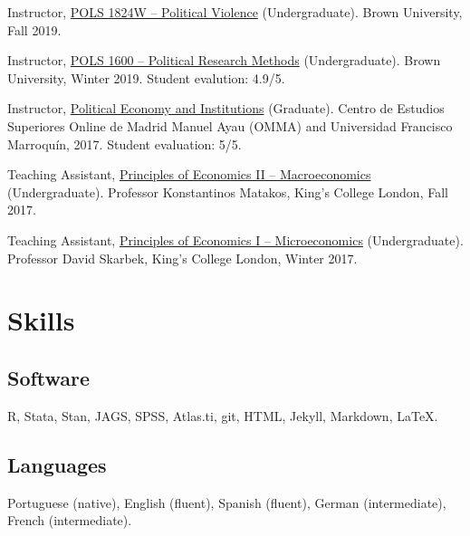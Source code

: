 \documentclass[a4paper]{article}
\renewenvironment{itemize}{
	\begin{list}{}{
			\setlength{\leftmargin}{1.5em}
		}
		}{
	\end{list}
}
\begin{document}
	\begin{itemize}
	\item Instructor, \href{http://danilofreire.github.io/pols1842w}{POLS 1824W -- Political Violence} (Undergraduate). Brown University, Fall 2019. 
	\item Instructor, \href{http://danilofreire.github.io}{POLS 1600 -- Political Research Methods} (Undergraduate). Brown University, Winter 2019. Student evalution: 4.9/5.
	\item Instructor, \href{https://github.com/danilofreire/economia-politica-instituicoes-ufm}{Political Economy and Institutions} (Graduate). Centro de Estudios Superiores Online de Madrid Manuel Ayau (OMMA) and Universidad Francisco Marroquín, 2017. Student evaluation: 5/5.
	\item Teaching Assistant, \href{https://github.com/danilofreire/core-econ}{Principles of Economics II -- Macroeconomics} (Undergraduate). Professor Konstantinos Matakos, King's College London, Fall 2017. 
	\item Teaching Assistant, \href{https://github.com/danilofreire/core-econ}{Principles of Economics I -- Microeconomics} (Undergraduate). Professor David Skarbek, King's College London, Winter 2017. 
	\end{itemize}

	\section*{Skills}

	\subsection*{Software}

	\begin{itemize}
		\item R, Stata, Stan, JAGS, SPSS, Atlas.ti, git, HTML, Jekyll, Markdown, \LaTeX{}.
	\end{itemize}

	\subsection*{Languages}

	\begin{itemize}
		\item Portuguese (native), English (fluent), Spanish (fluent), German (intermediate), French (intermediate).
	\end{itemize}
\end{document}
